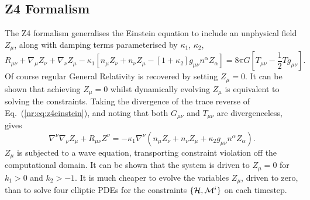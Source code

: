 \subsection{Z4 Formalism}
The Z4 formalism \cite{gundlach2005constraint} generalises the Einstein equation
to include an unphysical field $Z_\mu$, along with damping terms parameterised by
$\kappa_1$, $\kappa_2$,
\begin{equation}
\label{nr:eq:z4einstein} R_{\mu\nu} + \nabla_\mu Z_\nu +
\nabla_\nu Z_\mu - \kappa_1\left[ n_\mu Z_\nu + n_\nu Z_\mu -
[1+\kappa_2]g_{\mu\nu}n^\alpha Z_\alpha\right] = 8\pi G \left[T_{\mu\nu}-
\frac{1}{2}Tg_{\mu\nu} \right].
\end{equation}
Of course regular General Relativity is recovered by setting $Z_\mu=0$. It can
be shown that achieving $Z_\mu=0$ whilst dynamically evolving $Z_\mu$  is
equivalent to solving the constraints. Taking the divergence of
the trace reverse of Eq.~(\ref{nr:eq:z4einstein}),
and noting that both $G_{\mu\nu}$ and $T_{\mu\nu}$ are divergenceless, gives
\begin{equation}
\nabla^\nu \nabla_\nu Z_\mu  + R_{\mu\nu}Z^\nu = -\kappa_1 \nabla^\nu
\left( n_\mu Z_\nu + n_\nu Z_\mu + \kappa_2 g_{\mu\nu} n^\alpha Z_\alpha\right).
\end{equation}
$Z_\mu$ is subjected to a wave equation,
transporting constraint violation off the computational domain. It can be shown
that the system is driven to $Z_\mu =0$ for $k_1>0$ and $k_2>-1$. It is much
cheaper to evolve the variables $Z_\mu$, driven to zero, than to solve four
elliptic PDEs for the constraints $\{\mathcal{H},\mathcal{M}^i\}$ on each timestep.


